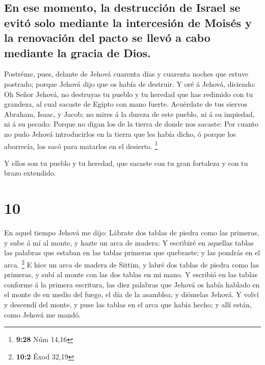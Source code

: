 \hypertarget{en-ese-momento-la-destrucciuxf3n-de-israel-se-evituxf3-solo-mediante-la-intercesiuxf3n-de-moisuxe9s-y-la-renovaciuxf3n-del-pacto-se-llevuxf3-a-cabo-mediante-la-gracia-de-dios.}{%
\subsection{En ese momento, la destrucción de Israel se evitó solo
mediante la intercesión de Moisés y la renovación del pacto se llevó a
cabo mediante la gracia de
Dios.}\label{en-ese-momento-la-destrucciuxf3n-de-israel-se-evituxf3-solo-mediante-la-intercesiuxf3n-de-moisuxe9s-y-la-renovaciuxf3n-del-pacto-se-llevuxf3-a-cabo-mediante-la-gracia-de-dios.}}

 Postréme, pues, delante de Jehová cuarenta días y cuarenta
noches que estuve postrado; porque Jehová dijo que os había de destruir.
 Y oré á Jehová, diciendo: Oh Señor Jehová, no destruyas tu
pueblo y tu heredad que has redimido con tu grandeza, al cual sacaste de
Egipto con mano fuerte.  Acuérdate de tus siervos Abraham,
Isaac, y Jacob; no mires á la dureza de este pueblo, ni á su impiedad,
ni á su pecado:  Porque no digan los de la tierra de donde
nos sacaste: Por cuanto no pudo Jehová introducirlos en la tierra que
les había dicho, ó porque los aborrecía, los sacó para matarlos en el
desierto. \footnote{\textbf{9:28} Núm 14,16}

 Y ellos son tu pueblo y tu heredad, que sacaste con tu
gran fortaleza y con tu brazo extendido.

\hypertarget{section-9}{%
\section{10}\label{section-9}}

 En aquel tiempo Jehová me dijo: Lábrate dos tablas de
piedra como las primeras, y sube á mí al monte, y hazte un arca de
madera:  Y escribiré en aquellas tablas las palabras que
estaban en las tablas primeras que quebraste; y las pondrás en el arca.
\footnote{\textbf{10:2} Éxod 32,19}  E hice un arca de
madera de Sittim, y labré dos tablas de piedra como las primeras, y subí
al monte con las dos tablas en mi mano.  Y escribió en las
tablas conforme á la primera escritura, las diez palabras que Jehová os
había hablado en el monte de en medio del fuego, el día de la asamblea;
y diómelas Jehová.  Y volví y descendí del monte, y puse las
tablas en el arca que había hecho; y allí están, como Jehová me mandó.

